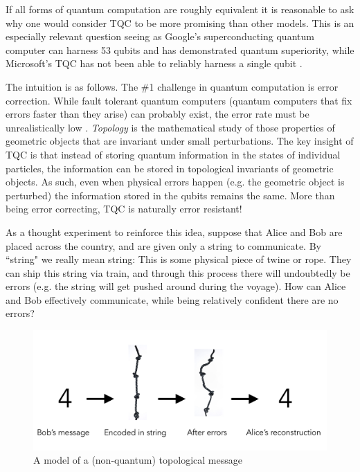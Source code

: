 \documentclass{article}
\theoremstyle{definition}
\numberwithin{figure}{section}
\begin{document}
If all forms of quantum computation are roughly equivalent it is reasonable to ask why one would consider TQC to be more promising than other models. This is an especially relevant question seeing as Google's superconducting quantum computer can harness 53 qubits and has demonstrated quantum superiority, while Microsoft's TQC has not been able to reliably harness a single qubit \cite{arute2019quantum}.

The intuition is as follows. The $\#$1 challenge in quantum computation is error correction. While fault tolerant quantum computers (quantum computers that fix errors faster than they arise) can probably exist, the error rate must be unrealistically low \cite{gottesman1998theory}. \textit{Topology} is the mathematical study of those properties of geometric objects that are invariant under small perturbations. The key insight of TQC is that instead of storing quantum information in the states of individual particles, the information can be stored in topological invariants of geometric objects. As such, even when physical errors happen (e.g. the geometric object is perturbed) the information stored in the qubits remains the same. More than being error correcting, TQC is naturally error resistant!

As a thought experiment to reinforce this idea, suppose that Alice and Bob are placed across the country, and are given only a string to communicate. By ``string" we really mean string: This is some physical piece of twine or rope. They can ship this string via train, and through this process there will undoubtedly be errors (e.g. the string will get pushed around during the voyage). How can Alice and Bob effectively communicate, while being relatively confident there are no errors?

\begin{figure}
\begin{center}
\includegraphics[scale=0.25]{rope-deformations}
\caption{A model of a (non-quantum) topological message}
\label{fig:rope-deformations}
\end{center}
\end{figure}
\end{document}
